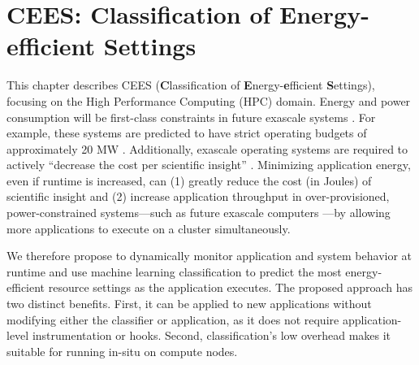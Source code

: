 \chapter{CEES: Classification of Energy-efficient Settings}

This chapter describes CEES (\textbf{C}lassification of \textbf{E}nergy-\textbf{e}fficient \textbf{S}ettings), focusing on the High Performance Computing (HPC) domain.
Energy and power consumption will be first-class constraints in future exascale systems \cite{exaosr-power}.
For example, these systems are predicted to have strict operating budgets of approximately 20 MW \cite{Exascale20MW}.
Additionally, exascale operating systems are required to actively ``decrease the cost per scientific insight'' \cite{DOEML}.  
Minimizing application energy, even if runtime is increased, can (1) greatly reduce the cost (in Joules) of scientific insight and (2) increase application throughput in over-provisioned, power-constrained systems---such as future exascale computers \cite{PatkiRMAP,Sarood2013}---by allowing more applications to execute on a cluster simultaneously.

We therefore propose to dynamically monitor application and system behavior at runtime and use machine learning classification to predict the most energy-efficient resource settings as the application executes.
The proposed approach has two distinct benefits.
First, it can be applied to new applications without modifying either the classifier or application, as it does not require application-level instrumentation or hooks.
Second, classification's low overhead makes it suitable for running in-situ on compute nodes.






